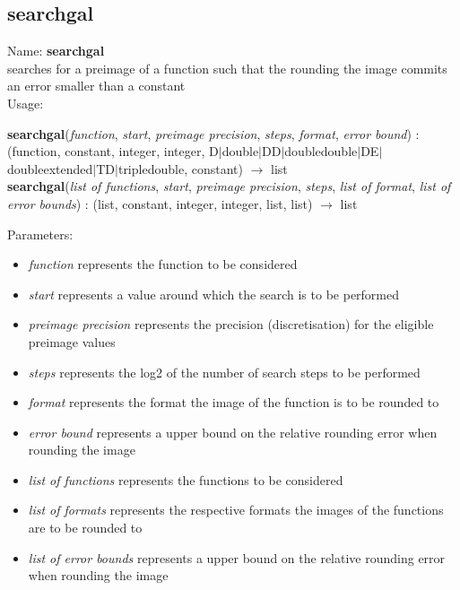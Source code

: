 \subsection{ searchgal }
\noindent Name: \textbf{searchgal}\\
searches for a preimage of a function such that the rounding the image commits an error smaller than a constant\\

\noindent Usage: 
\begin{center}
\textbf{searchgal}(\emph{function}, \emph{start}, \emph{preimage precision}, \emph{steps}, \emph{format}, \emph{error bound}) : (\textsf{function}, \textsf{constant}, \textsf{integer}, \textsf{integer}, \textsf{D$|$double$|$DD$|$doubledouble$|$DE$|$doubleextended$|$TD$|$tripledouble}, \textsf{constant}) $\rightarrow$ \textsf{list}\\
\textbf{searchgal}(\emph{list of functions}, \emph{start}, \emph{preimage precision}, \emph{steps}, \emph{list of format}, \emph{list of error bounds}) : (\textsf{list}, \textsf{constant}, \textsf{integer}, \textsf{integer}, \textsf{list}, \textsf{list}) $\rightarrow$ \textsf{list}\\
\end{center}
Parameters: 
\begin{itemize}
\item \emph{function} represents the function to be considered
\item \emph{start} represents a value around which the search is to be performed
\item \emph{preimage precision} represents the precision (discretisation) for the eligible preimage values
\item \emph{steps} represents the log2 of the number of search steps to be performed
\item \emph{format} represents the format the image of the function is to be rounded to
\item \emph{error bound} represents a upper bound on the relative rounding error when rounding the image
\item \emph{list of functions} represents the functions to be considered
\item \emph{list of formats} represents the respective formats the images of the functions are to be rounded to
\item \emph{list of error bounds} represents a upper bound on the relative rounding error when rounding the image
\end{itemize}
